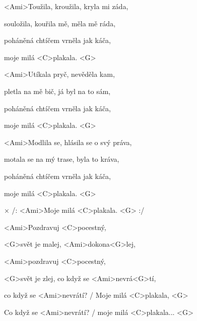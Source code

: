 

\zs
<Ami>Toužila, kroužila, kryla mi záda,

souložila, kouřila mě, měla mě ráda,

poháněná chtíčem vrněla jak káča,

moje milá <C>plakala. <G>
\ks

\zs
<Ami>Utíkala pryč, nevěděla kam,

pletla na mě bič, já byl na to sám,

poháněná chtíčem vrněla jak káča,

moje milá <C>plakala. <G>
\ks

\zs
<Ami>Modlila se, hlásila se o svý práva,

motala se na mý trase, byla to kráva,

poháněná chtíčem vrněla jak káča,

moje milá <C>plakala. <G>
\ks

× /: <Ami>Moje milá <C>plakala. <G> :/

<Ami>Pozdravuj <C>pocestný,

<G>svět je malej, <Ami>dokona<G>lej,

<Ami>pozdravuj <C>pocestný,

<G>svět je zlej, co když se <Ami>nevrá<G>tí,

co když se <Ami>nevrátí? / Moje milá <C>plakala, <G>

Co když se <Ami>nevrátí? / moje milá <C>plakala... <G>

\kr

\kp



















